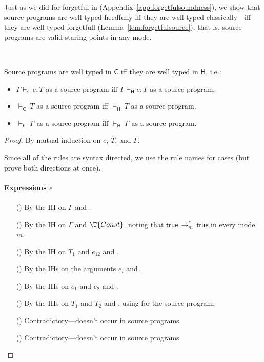 \documentclass[9pt]{extarticle}
\newcommand{\ottnt}[1]{\mathit{#1}}
\newcommand{\ottmv}[1]{\mathit{#1}}
\begin{document}
{Just as we did for forgetful \lambdah in
(Appendix~\ref{app:forgetfulsoundness}), we show that source programs
are well typed heedfully iff they are well typed classically---iff
they are well typed forgetfull (Lemma~\ref{lem:forgetfulsource}). that
is, source programs are valid staring points in any mode.

\begin{lemma}
  \label{lem:heedfulsource}
  ~

  \noindent
  Source programs are well typed in $ \mathsf{C} $ iff they are well typed in
  $ \mathsf{H} $, i.e.:
\begin{itemize}
  \item $ \Gamma   \vdash _{  \mathsf{C}  }  \ottnt{e}  :  \ottnt{T} $ as a source program iff $ \Gamma   \vdash _{  \mathsf{H}  }  \ottnt{e}  :  \ottnt{T} $ as
    a source program.
  \item $ \mathord{  \vdash _{  \mathsf{C}  } }~ \ottnt{T} $ as a source program iff $ \mathord{  \vdash _{  \mathsf{H}  } }~ \ottnt{T} $ as a source program.
  \item $ \mathord{  \vdash _{  \mathsf{C}  } }~ \Gamma $ as a source program iff $ \mathord{  \vdash _{  \mathsf{H}  } }~ \Gamma $ as a source program.
  \end{itemize}
\begin{proof}
    By mutual induction on $\ottnt{e}$, $\ottnt{T}$, and $\Gamma$.
{\iffull
    Since all of the rules are syntax directed, we use the rule names
    for cases (but prove both directions at once).
\paragraph{Expressions $\ottnt{e}$}
    \begin{itemize}
    \item[(\T{Var})] By the IH on $\Gamma$ and .
    \item[(\T{Const})] By the IH on $\Gamma$ and $\T{Const}$, noting
      that $ \mathsf{true}  \,  \longrightarrow ^{*}_{ \ottnt{m} }  \,  \mathsf{true} $ in every mode $\ottnt{m}$.
    \item[(\T{Abs})] By the IH on $\ottnt{T_{{\mathrm{1}}}}$ and $\ottnt{e_{{\mathrm{12}}}}$ and .
    \item[(\T{Op})] By the IHs on the arguments $\ottnt{e_{\ottmv{i}}}$ and .
    \item[(\T{App})] By the IHs on $\ottnt{e_{{\mathrm{1}}}}$ and $\ottnt{e_{{\mathrm{2}}}}$ and .
    \item[(\T{Cast})] By the IHs on $\ottnt{T_{{\mathrm{1}}}}$ and $\ottnt{T_{{\mathrm{2}}}}$ and
      , using  for the source program.
    \item[(\T{Blame})] Contradictory---doesn't occur in source programs.
    \item[(\T{Check})] Contradictory---doesn't occur in source programs.
    \end{itemize}
    
}
\end{proof}
\end{lemma}}
\end{document}
